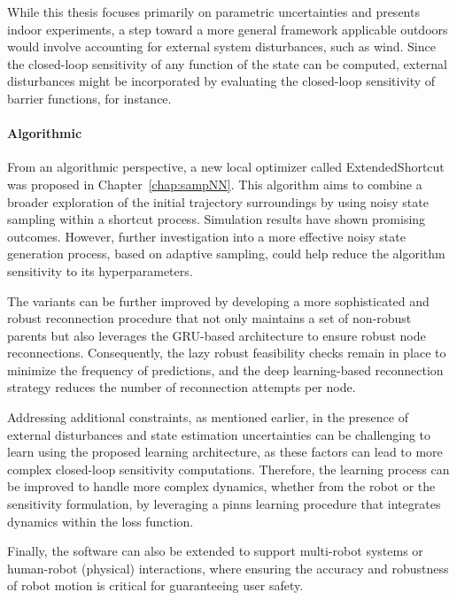 While this thesis focuses primarily on parametric uncertainties and presents indoor experiments, a step toward a more general framework applicable outdoors would involve accounting for external system disturbances, such as wind.
Since the closed-loop sensitivity of any function of the state can be computed, external disturbances might be incorporated by evaluating the closed-loop sensitivity of barrier functions, for instance.

\paragraph{Algorithmic}

From an algorithmic perspective, a new local optimizer called ExtendedShortcut was proposed in Chapter~\ref{chap:sampNN}. 
This algorithm aims to combine a broader exploration of the initial trajectory surroundings by using noisy state sampling within a shortcut process. 
Simulation results have shown promising outcomes. 
However, further investigation into a more effective noisy state generation process, based on adaptive sampling, could help reduce the algorithm sensitivity to its hyperparameters.

The  variants can be further improved by developing a more sophisticated and robust reconnection procedure that not only maintains a set of non-robust parents but also leverages the GRU-based architecture to ensure robust node reconnections.
Consequently, the lazy robust feasibility checks remain in place to minimize the frequency of predictions, and the deep learning-based reconnection strategy reduces the number of reconnection attempts per node.

Addressing additional constraints, as mentioned earlier, in the presence of external disturbances and state estimation uncertainties can be challenging to learn using the proposed learning architecture, as these factors can lead to more complex closed-loop sensitivity computations.
Therefore, the learning process can be improved to handle more complex dynamics, whether from the robot or the sensitivity formulation, by leveraging a \gls{pinns} learning procedure that integrates  dynamics within the loss function.

Finally, the software can also be extended to support multi-robot systems or human-robot (physical) interactions, where ensuring the accuracy and robustness of robot motion is critical for guaranteeing user safety.